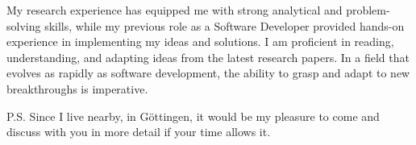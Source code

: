 \documentclass[11pt, a4paper]{awesome-cv}
\begin{document}
\begin{cvletter}
My research experience has equipped me with strong analytical and problem-solving skills, while my previous role as a Software Developer provided hands-on experience in implementing my ideas and solutions. I am proficient in reading, understanding, and adapting ideas from the latest research papers. In a field that evolves as rapidly as software development, the ability to grasp and adapt to new breakthroughs is imperative.

P.S. Since I live nearby, in Göttingen, it would be my pleasure to come and discuss with you in more detail if your time allows it.

\end{cvletter}


\makeletterclosing
\end{document}
